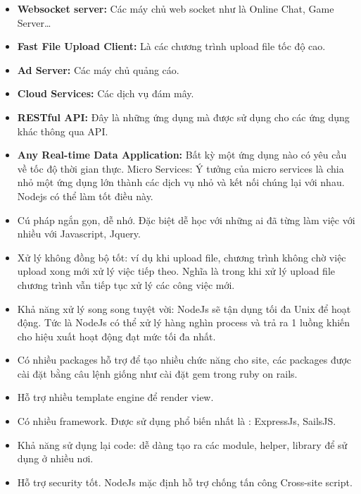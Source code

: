 \begin{itemize}
  \item \textbf{Websocket server:} Các máy chủ web socket như là Online Chat, Game Server…
  \item \textbf{Fast File Upload Client:} Là các chương trình upload file tốc độ cao.
  \item \textbf{Ad Server:} Các máy chủ quảng cáo.
  \item \textbf{Cloud Services:} Các dịch vụ đám mây.
  \item \textbf{RESTful API:} Đây là những ứng dụng mà được sử dụng cho các ứng dụng khác thông qua API.
  \item \textbf{Any Real-time Data Application:} Bất kỳ một ứng dụng nào có yêu cầu về tốc độ thời gian thực. Micro Services: Ý tưởng của micro services là chia nhỏ một ứng dụng lớn thành các dịch vụ nhỏ và kết nối chúng lại với nhau. Nodejs có thể làm tốt điều này.
\end{itemize}

\begin{itemize}
  \item Cú pháp ngắn gọn, dễ nhớ. Đặc biệt dễ học với những ai đã từng làm việc với nhiều với Javascript, Jquery.
  \item Xử lý không đồng bộ tốt: ví dụ khi upload file, chương trình không chờ việc upload xong mới xử lý việc tiếp theo. Nghĩa là trong khi xử lý upload file chương trình vẫn tiếp tục xử lý các công việc mới.
  \item Khả năng xử lý song song tuyệt vời: NodeJs sẽ tận dụng tối đa Unix để hoạt động. Tức là NodeJs có thể xử lý hàng nghìn process và trả ra 1 luồng khiến cho hiệu xuất hoạt động đạt mức tối đa nhất.
  \item Có nhiều packages hỗ trợ để tạo nhiều chức năng cho site, các packages được cài đặt bằng câu lệnh giống như cài đặt gem trong ruby on rails.
  \item Hỗ trợ nhiều template engine để render view.
  \item Có nhiều framework. Được sử dụng phổ biến nhất là : ExpressJs, SailsJS.
  \item Khả năng sử dụng lại code: dễ dàng tạo ra các module, helper, library để sử dụng ở nhiều nơi.
  \item Hỗ trợ security tốt. NodeJs mặc định hỗ trợ chống tấn công Cross-site script.
\end{itemize}

